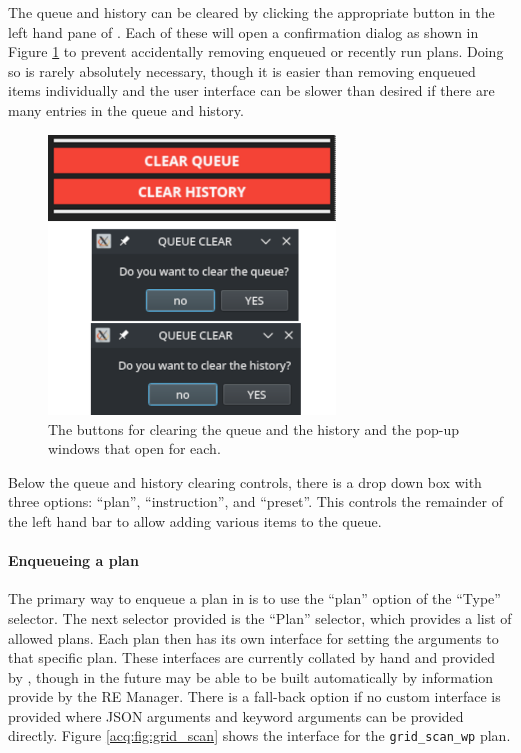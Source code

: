 The queue and history can be cleared by clicking the appropriate button in the left hand pane of \blueskycmds.
Each of these will open a confirmation dialog as shown in Figure \ref{acq:fig:queue_clear} to prevent accidentally removing enqueued or recently run plans.
Doing so is rarely absolutely necessary, though it is easier than removing enqueued items individually and the user interface can be slower than desired if there are many entries in the queue and history.

\begin{figure}
\includegraphics[width=3in]{"acquisition/images/queue_clear"}
\caption[The Queue and History Clear Workflow]{
	The buttons for clearing the queue and the history and the pop-up windows that open for each.
}
\label{acq:fig:queue_clear}
\end{figure}

Below the queue and history clearing controls, there is a drop down box with three options: ``plan'', ``instruction'', and ``preset''.
This controls the remainder of the left hand bar to allow adding various items to the queue.

\paragraph{Enqueueing a plan}

The primary way to enqueue a plan in \blueskycmds is to use the ``plan'' option of the ``Type'' selector.
The next selector provided is the ``Plan'' selector, which provides a list of allowed plans.
Each plan then has its own interface for setting the arguments to that specific plan.
These interfaces are currently collated by hand and provided by \blueskycmds, though in the future may be able to be built automatically by information provide by the RE Manager.
There is a fall-back option if no custom interface is provided where JSON arguments and keyword arguments can be provided directly.
Figure \ref{acq:fig:grid_scan} shows the interface for the \texttt{grid\_scan\_wp} plan.

